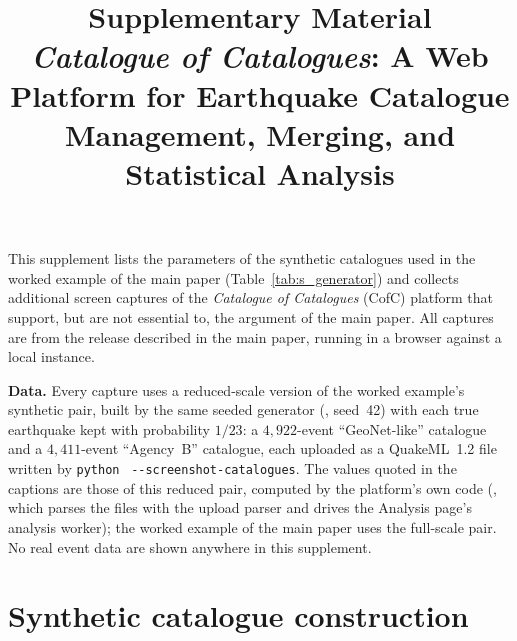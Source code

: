 \documentclass[11pt]{article}
\title{\textbf{Supplementary Material}\\[4pt]
\large \emph{Catalogue of Catalogues}: A Web Platform for Earthquake
Catalogue Management, Merging, and Statistical Analysis}
\author{}
\date{}
\begin{document}
\maketitle
\vspace{-2.2\baselineskip}

\noindent
This supplement lists the parameters of the synthetic catalogues used in the
worked example of the main paper (Table~\ref{tab:s_generator}) and collects
additional screen captures of the \emph{Catalogue of Catalogues} (CofC) platform
that support, but are not essential to, the argument of the main paper.  All
captures are from the release described in the main paper, running in a browser
against a local instance.

\medskip
\noindent
\textbf{Data.}  Every capture uses a reduced-scale version of the worked
example's synthetic pair, built by the same seeded generator
(, seed~42) with each true
earthquake kept with probability $1/23$: a $4{,}922$-event ``GeoNet-like''
catalogue and a $4{,}411$-event ``Agency~B'' catalogue, each uploaded as a
QuakeML~1.2 file written by
\texttt{python}~
\texttt{-{}-screenshot-catalogues}.
The values quoted in the captions are those of this reduced pair, computed by
the platform's own code (, which
parses the files with the upload parser and drives the Analysis page's analysis
worker); the worked example of the main paper uses the full-scale pair.  No real
event data are shown anywhere in this supplement.

\section*{Synthetic catalogue construction}
\end{document}
